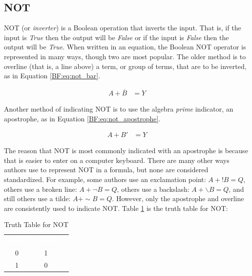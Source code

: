 \subsection{NOT}
\label{BF:subsec:not}

\textsf{NOT} (or \emph{inverter}) is a Boolean operation that inverts the input. That is, if the input is \emph{True} then the output will be \emph{False} or if the input is \emph{False} then the output will be \emph{True}. When written in an equation, the Boolean \textsf{NOT}  operator is represented in many ways, though two are most popular. The older method is to overline (that is, a line above) a term, or group of terms, that are to be inverted, as in Equation \ref{BF:eq:not_bar}.

\begin{align}
  \label{BF:eq:not_bar}
  A + \overline{B} &= Y 
\end{align}

Another method of indicating \textsf{NOT}  is to use the algebra \emph{prime} indicator, an apostrophe, as in Equation \ref{BF:eq:not_apostrophe}.

\begin{align}
  \label{BF:eq:not_apostrophe}
  A + B' &= Y 
\end{align}

The reason that \textsf{NOT} is most commonly indicated with an apostrophe is because that is easier to enter on a computer keyboard. There are many other ways authors use to represent \textsf{NOT}  in a formula, but none are considered standardized. For example, some authors use an exclamation point: $ A+!B=Q $, others use a broken line: $ A+ \neg B=Q $, others use a backslash: $ A+ \backslash B=Q $, and still others use a tilde: $ A+ \sim B =Q $. However, only the apostrophe and overline are consistently used to indicate \textsf{NOT}. Table \ref{BF:tab:truth_table_for_not} is the truth table for \textsf{NOT}:

\begin{table}[H]
  \sffamily
  \newcommand{\head}[1]{\textcolor{white}{\textbf{#1}}}    
  \begin{center}
    \begin{tabular}{ccc} 
      \rowcolor{black!75}
      \head{Input} & \head{Output} \\
      0 & 1 \\
      1 & 0 \\
    \end{tabular}
  \end{center}
  \caption{Truth Table for NOT}
  \label{BF:tab:truth_table_for_not}
\end{table}

